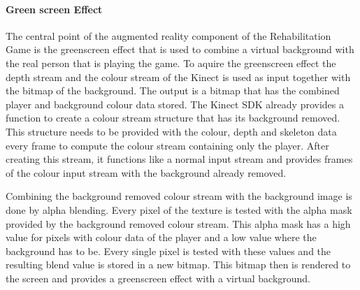 \paragraph{Green screen Effect}
The central point of the augmented reality component of the Rehabilitation Game is the greenscreen effect that is used to combine a virtual background with the real person that is playing the game. To aquire the greenscreen effect the depth stream and the colour stream of the Kinect is used as input together with the bitmap of the background. The output is a bitmap that has the combined player and background colour data stored.
The Kinect SDK already provides a function to create a colour stream structure that has its background removed. This structure needs to be provided with the colour, depth and skeleton data every frame to compute the colour stream containing only the player. After creating this stream, it functions like a normal input stream and provides frames of the colour input stream with the background already removed.

Combining the background removed colour stream with the background image is done by alpha blending. Every pixel of the texture is tested with the alpha mask provided by the background removed colour stream. This alpha mask has a high value for pixels with colour data of the player and a low value where the background has to be. Every single pixel is tested with these values and the resulting blend value is stored in a new bitmap. This bitmap then is rendered to the screen and provides a greenscreen effect with a virtual background.

